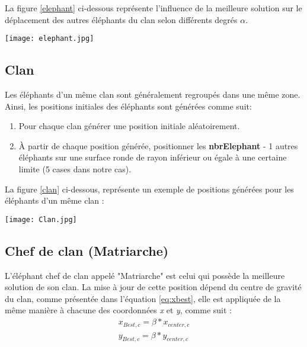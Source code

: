 La figure \ref{elephant} ci-dessous représente l'influence de la meilleure solution sur le déplacement des autres éléphants du clan selon différents degrés $\alpha$.
\begin{center}	  
	\texttt{[image: elephant.jpg]}%
	\vspace{-0.3cm}
	\label{elephant}%
\end{center}

\subsection{Clan}
\label{clanArea}
Les éléphants d'un même clan sont généralement regroupés dans une même zone. Ainsi, les positions initiales des éléphants sont générées comme suit:
\begin{enumerate}
	\item Pour chaque clan générer une position initiale aléatoirement.
	\item À partir de chaque position générée, positionner les \textbf{nbrElephant} - 1 autres éléphants sur une surface ronde de rayon inférieur ou égale à une certaine limite (5 cases dans notre cas).
\end{enumerate}
La figure \ref{clan} ci-dessous, représente un exemple de positions générées pour les éléphants d'un même clan :
\begin{center}	  
	\texttt{[image: Clan.jpg]}%
	\vspace{-0.1 cm}
	\label{clan}%
\end{center}

\subsection{Chef de clan (Matriarche) }
L'éléphant chef de clan appelé "Matriarche" est celui qui possède la meilleure solution de son clan. La mise à jour de cette position dépend du centre de gravité du clan, comme présentée dans l'équation \ref{eq:xbest}, elle est appliquée de la même manière à chacune des coordonnées \textit{x} et \textit{y}, comme suit :
\begin{equation}
\begin{split}
{x}_{Best,c} = \beta  *  {x}_{center,c} \\
{y}_{Best,c} = \beta  *  {y}_{center,c}  
\end{split}
\end{equation}

